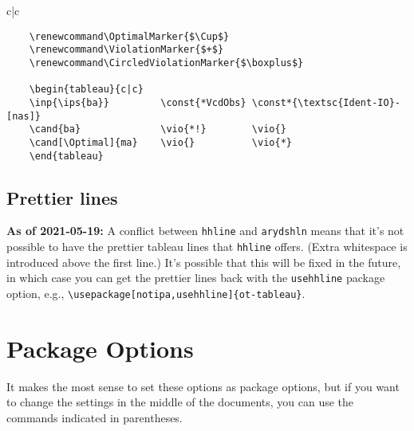 \documentclass{article}
\begin{document}
\begin{center}
	\CircledViolationsOn
	\renewcommand\OptimalMarker{$\Cup$}
	\renewcommand\ViolationMarker{$+$}
	\renewcommand\CircledViolationMarker{$\boxplus$}
	\begin{tableau}{c|c}
	          
	       \vio{*!}        \vio{}
	  \vio{}          \vio{*}
	\end{tableau}
	\CircledViolationsOff
\end{center}

\begin{verbatim}
	\renewcommand\OptimalMarker{$\Cup$}
	\renewcommand\ViolationMarker{$+$}
	\renewcommand\CircledViolationMarker{$\boxplus$}
	
	\begin{tableau}{c|c}
	\inp{\ips{ba}}         \const{*VcdObs} \const*{\textsc{Ident-IO}-[nas]}
	\cand{ba}              \vio{*!}        \vio{}
	\cand[\Optimal]{ma}    \vio{}          \vio{*}
	\end{tableau}
\end{verbatim}

\subsection{Prettier lines}
\textbf{As of 2021-05-19:} A conflict between \verb+hhline+ and \verb+arydshln+ means that it's not possible to have the prettier tableau lines that \verb+hhline+ offers. (Extra whitespace is introduced above the first line.) It's possible that this will be fixed in the future, in which case you can get the prettier lines back with the \verb+usehhline+ package option, e.g., \verb+\usepackage[notipa,usehhline]{ot-tableau}+.


\section{Package Options}
It makes the most sense to set these options as package options, but if you want to change the settings in the middle of the documents, you can use the commands indicated in parentheses.
\end{document}
